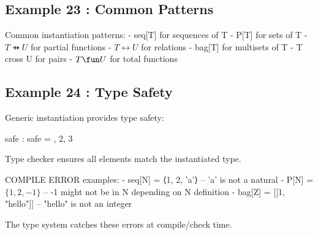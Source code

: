 \documentclass[a4paper,10pt,fleqn]{article}
\begin{document}
\bigskip

\subsection*{Example 23 : Common Patterns}

\noindent Common instantiation patterns: - seq[T] for sequences of T - P[T] for sets of T - $T \pfun U$ for partial functions - $T \rel U$ for relations - bag[T] for multisets of T - T cross U for pairs - $T \fun U$ for total functions

\bigskip

\subsection*{Example 24 : Type Safety}

\noindent Generic instantiation provides type safety:

\bigskip

\begin{axdef}
safe : \seq \nat
\where
safe = , 2, 3 \rangle
\end{axdef}

\noindent Type checker ensures all elements match the instantiated type.

\bigskip

\noindent COMPILE ERROR examples: - seq[N] = ⟨1, 2, 'a'⟩ -- 'a' is not a natural - P[N] = $\{1, 2, -1\}$ -- -1 might not be in N depending on N definition - bag[Z] = [[1, "hello"]] -- "hello" is not an integer

\bigskip

\noindent The type system catches these errors at compile/check time.

\bigskip
\end{document}
